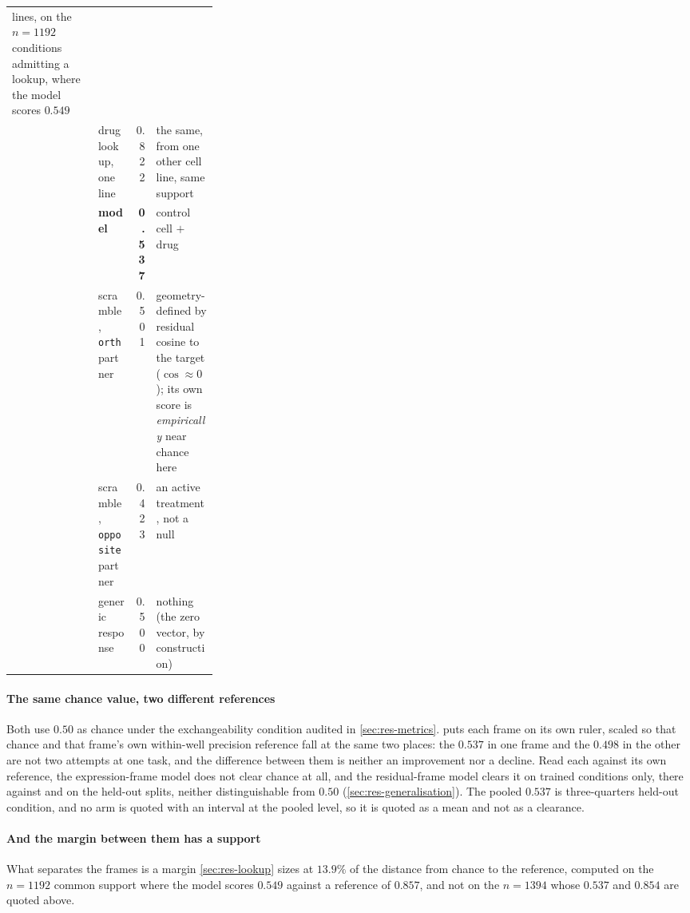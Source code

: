 \begin{table}[htbp]
\begin{fullwidth}
\begin{threeparttable}
\begin{tabular}{llr>{\raggedright\arraybackslash}p{0.30\linewidth}}
lines, on the $n = \num{1192}$ conditions admitting a lookup, where the model
scores $0.549$ \\
 & drug lookup, one line & 0.822 & the same, from one other cell line, same
support \\
 & \textbf{model} & \textbf{0.537} & control cell $+$ drug \\
 & scramble, \texttt{orth} partner & 0.501 & geometry-defined by residual cosine
to the target ($\cos \approx 0$); its own score is \emph{empirically} near chance
here \\
 & scramble, \texttt{opposite} partner & 0.423 & an active treatment, not a
null \\
 & generic response & 0.500 & nothing (the zero vector, by construction) \\
\bottomrule
\end{tabular}
\end{threeparttable}
\end{fullwidth}
\end{table}

\paragraph{The same chance value, two different references} Both use $0.50$ as
chance under the exchangeability condition audited in \cref{sec:res-metrics}.
 puts each frame on its own ruler, scaled so that chance and
that frame's own within-well precision reference fall at the same two places: the
$0.537$ in one frame and
the $0.498$ in the other are not two attempts at one task, and the difference
between them is neither an improvement nor a decline. Read each against its own
reference, the expression-frame model does not clear chance at all, and the
residual-frame model clears it on trained conditions only,
 there against  and
 on the held-out splits, neither distinguishable from
$0.50$ (\cref{sec:res-generalisation}). The pooled $0.537$ is three-quarters
held-out condition, and no arm is quoted with an interval at the pooled level, so
it is quoted as a mean and not as a clearance.


\paragraph{And the margin between them has a support} What separates the frames
is a margin \cref{sec:res-lookup} sizes at $13.9\%$ of the distance from chance
to the reference, computed on the $n = \num{1192}$ common support where the model
scores $0.549$ against a reference of $0.857$, and not on the $n = \num{1394}$
whose $0.537$ and $0.854$ are quoted above.

